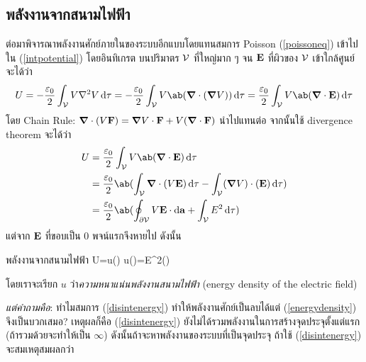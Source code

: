 \subsection{พลังงานจากสนามไฟฟ้า}
ต่อมาพิจารณาพลังงานศักย์ภายในของระบบอีกแบบโดยแทนสมการ Poisson (\ref{poissoneq}) เข้าไปใน (\ref{intpotential}) โดยอินทิเกรต บนปริมาตร $\mathcal{V}$ ที่ใหญ่มาก ๆ จน $\mathbf{E}$ ที่ผิวของ $\mathcal{V}$ เข้าใกล้ศูนย์ จะได้ว่า
\[U=-\frac{\eps_0}{2}\int_\vol V\nabla^2 V\odif{\tau}=-\frac{\eps_0}{2}\int_\vol V\ab(\gd\cdot(\gd V))\odif{\tau}=\frac{\eps_0}{2}\int_\vol V\ab(\gd\cdot\vb{E})\odif{\tau}\]
โดย Chain Rule: $\boldsymbol{\nabla}\cdot( V\mathbf{F})=\boldsymbol{\nabla} V\cdot\mathbf{F}+ V(\boldsymbol{\nabla}\cdot\mathbf{F})$ นำไปแทนต่อ จากนั้นใช้ divergence theorem จะได้ว่า
\begin{align*}
    U&=\frac{\eps_0}{2}\int_\vol V\ab(\gd\cdot\vb{E})\odif{\tau}\\
    &=\frac{\eps_0}{2}\ab(\int_\vol\gd\cdot( V\vb{E})\odif{\tau}-\int_\vol(\gd V)\cdot(\vb{E})\odif{\tau})\\
    &=\frac{\eps_0}{2}\ab(\oint_{\del\vol} V\vb{E}\cdot\odif{\vb{a}}+\int_\vol E^2\odif{\tau})
\end{align*}
แต่จาก $\mathbf{E}$ ที่ขอบเป็น $0$ พจน์แรกจึงหายไป ดังนั้น
\begin{ieqbox}{พลังงานจากสนามไฟฟ้า}
    U=\int u()\odif{\tau} u()=E^2()\label{energydensity}
\end{ieqbox}
โดยเราจะเรียก $u$ ว่า\emph{ความหนาแน่นพลังงานสนามไฟฟ้า} (energy density of the electric field)

\emph{แต่คำถามคือ}: ทำไมสมการ (\ref{disintenergy}) ทำให้พลังงานศักย์เป็นลบได้แต่ (\ref{energydensity}) จึงเป็นบวกเสมอ? เหตุผลก็คือ (\ref{disintenergy}) ยังไม่ได้รวมพลังงานในการสร้างจุดประจุตั้งแต่แรก (ถ้ารวมด้วยจะทำให้เป็น $\infty$) ดังนั้นถ้าจะหาพลังงานของระบบที่เป็นจุดประจุ ถ้าใช้ (\ref{disintenergy}) จะสมเหตุสมผลกว่า

